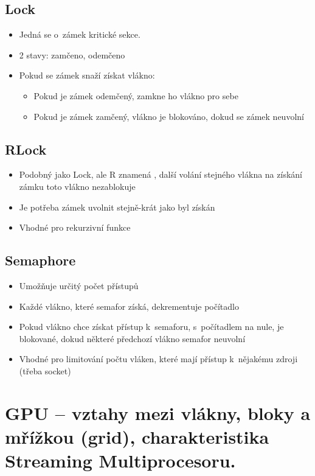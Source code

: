 \subsection{Lock}
\begin{itemize}
    \item Jedná se o~zámek kritické sekce. 
    \item 2 stavy: zamčeno, odemčeno
    \item Pokud se zámek snaží získat vlákno:
    \begin{itemize}
        \item Pokud je zámek odemčený, zamkne ho vlákno pro sebe
        \item Pokud je zámek zamčený, vlákno je blokováno, dokud se zámek neuvolní
    \end{itemize}
\end{itemize}

\subsection{RLock}
\begin{itemize}
    \item Podobný jako Lock, ale R znamená , další volání stejného vlákna na získání zámku toto vlákno nezablokuje
    \item Je potřeba zámek uvolnit stejně-krát jako byl získán
    \item Vhodné pro rekurzivní funkce
\end{itemize}

\subsection{Semaphore}
\begin{itemize}
    \item Umožňuje určitý počet přístupů
    \item Každé vlákno, které semafor získá, dekrementuje počítadlo
    \item Pokud vlákno chce získat přístup k~semaforu, s~počítadlem na nule, je blokované, dokud některé předchozí vlákno semafor neuvolní
    \item Vhodné pro limitování  počtu vláken, které mají přístup k~nějakému zdroji (třeba socket)
\end{itemize}


\section{GPU – vztahy mezi vlákny, bloky a mřížkou (grid), charakteristika Streaming Multiprocesoru.}
